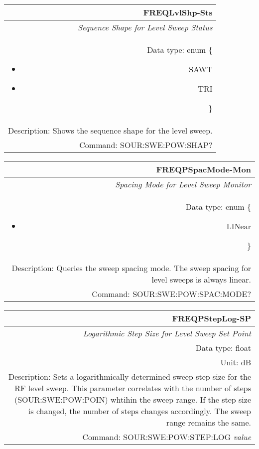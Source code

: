 \documentclass[openany]{article}
\begin{document}
		\begin{tabular}{N}
			\hline
			\bfseries FREQLvlShp-Sts \\ \hline
			\emph{Sequence Shape for Level Sweep Status} \\
			Data type: enum \{\begin{itemize}[noitemsep]
				\small
				\item[] SAWT
				\item[] TRI
			\end{itemize}\} \\ 
			Description: Shows the sequence shape for the level sweep. \\
			Command: SOUR:SWE:POW:SHAP? \\

		\end{tabular}
%
		\begin{tabular}{N}
			\hline
			\bfseries FREQPSpacMode-Mon \\ \hline
			\emph{Spacing Mode for Level Sweep Monitor} \\
			Data type: enum \{\begin{itemize}[noitemsep]
				\small
				\item[] LINear
			\end{itemize}\} \\
			Description: Queries the sweep spacing mode. The sweep spacing for level sweeps is always linear. \\
			Command: SOUR:SWE:POW:SPAC:MODE? \\
			
		\end{tabular}
%
		\begin{tabular}{N}
			\hline
			\bfseries FREQPStepLog-SP \\ \hline
			\emph{Logarithmic Step Size for Level Sweep Set Point} \\
			Data type: float \\
			Unit: dB \\ 
			Description: Sets a logarithmically determined sweep step size for the RF level sweep. This parameter correlates with the number of steps (SOUR:SWE:POW:POIN) whtihin the sweep range. If the step size is changed, the number of steps changes accordingly. The sweep range remains the same. \\
			Command: SOUR:SWE:POW:STEP:LOG \emph{value} \\
			
		\end{tabular}
\end{document}
